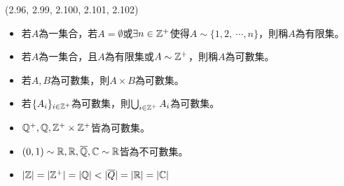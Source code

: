 \item \begin{theorem}{(2.96, 2.99, 2.100, 2.101, 2.102)} \quad\quad
    \begin{itemize}
        \item 若$A$為一集合，若$A = \emptyset$或$\exists n \in \mathbb{Z}^+$使得$A \sim \{1, 2, \ \cdots, n\}$，則稱$A$為有限集。
        \item 若$A$為一集合，且$A$為有限集或$A \sim \mathbb{Z}^+$，則稱$A$為可數集。
        \item 若$A, B$為可數集，則$A \times B$為可數集。
        \item 若$\{A_i\}_{i \in \mathbb{Z}^+}$為可數集，則$\bigcup_{i \in \mathbb{Z}^+}A_i$為可數集。
        \item $\mathbb{Q}^+, \mathbb{Q}, \mathbb{Z}^+ \times \mathbb{Z}^+$皆為可數集。
        \item $(0, 1) \sim \mathbb{R}, \mathbb{R}, \overline{\mathbb{Q}}, \mathbb{C} \sim \mathbb{R}$皆為不可數集。
        \item $|\mathbb{Z}| = |\mathbb{Z}^+| = |\mathbb{Q}| < |\overline{Q}| = |\mathbb{R}| = |\mathbb{C}|$
    \end{itemize}
\end{theorem}
